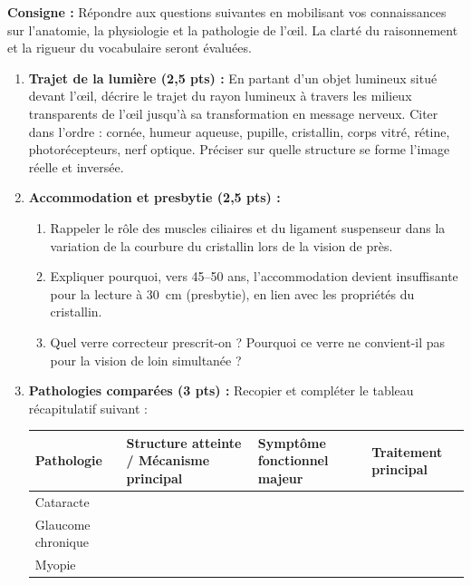 \documentclass[11pt]{article}
\begin{document}
\begin{exercice}
\textbf{Consigne :} Répondre aux questions suivantes en mobilisant vos connaissances sur l'anatomie, la physiologie et la pathologie de l'œil. La clarté du raisonnement et la rigueur du vocabulaire seront évaluées.

\begin{enumerate}
\item \textbf{Trajet de la lumière (2,5 pts) :} En partant d'un objet lumineux situé devant l'œil, décrire le trajet du rayon lumineux à travers les milieux transparents de l'œil jusqu'à sa transformation en message nerveux. Citer dans l'ordre : cornée, humeur aqueuse, pupille, cristallin, corps vitré, rétine, photorécepteurs, nerf optique. Préciser sur quelle structure se forme l'image réelle et inversée.
\item \textbf{Accommodation et presbytie (2,5 pts) :}
\begin{enumerate}
\item Rappeler le rôle des muscles ciliaires et du ligament suspenseur dans la variation de la courbure du cristallin lors de la vision de près.
\item Expliquer pourquoi, vers 45--50 ans, l'accommodation devient insuffisante pour la lecture à \SI{30}{cm} (presbytie), en lien avec les propriétés du cristallin.
\item Quel verre correcteur prescrit-on ? Pourquoi ce verre ne convient-il pas pour la vision de loin simultanée ?
\end{enumerate}
\item \textbf{Pathologies comparées (3 pts) :} Recopier et compléter le tableau récapitulatif suivant :
\begin{center}
\begin{tabularx}{\linewidth}{|l|X|X|X|}\hline
\textbf{Pathologie} & \textbf{Structure atteinte / Mécanisme principal} & \textbf{Symptôme fonctionnel majeur} & \textbf{Traitement principal} \\ \hline
Cataracte & & & \\ \hline
Glaucome chronique & & & \\ \hline
Myopie & & & \\ \hline
\end{tabularx}
\end{center}
\end{enumerate}
\end{exercice}
\end{document}
